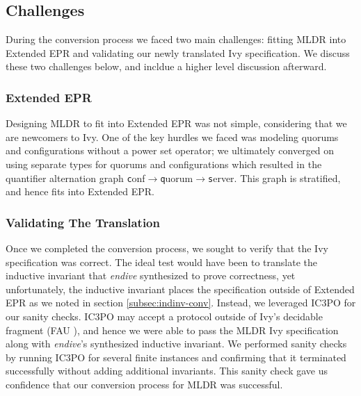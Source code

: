 \documentclass[runningheads]{llncs}
\newcommand{\ivy}[1]{{\texttt #1}}
\begin{document}
\subsection{Challenges}

During the conversion process we faced two main challenges: fitting MLDR into Extended EPR and validating our newly translated Ivy specification.  We discuss these two challenges below, and incldue a higher level discussion afterward.

\subsubsection{Extended EPR}
\label{sec:mldr-epr}



Designing MLDR to fit into Extended EPR was not simple, considering that we are newcomers to Ivy.  One of the key hurdles we faced was modeling quorums and configurations without a power set operator; we ultimately converged on using separate types for quorums and configurations which resulted in the quantifier alternation graph \ivy{conf}$\to$\ivy{quorum}$\to$\ivy{server}.  This graph is stratified, and hence fits into Extended EPR.  

\subsubsection{Validating The Translation}


Once we completed the conversion process, we sought to verify that the Ivy specification was correct.  The ideal test would have been to translate the inductive invariant that \textit{endive} synthesized to prove correctness, yet unfortunately, the inductive invariant places the specification outside of Extended EPR as we noted in section \ref{subsec:indinv-conv}.  Instead, we leveraged IC3PO for our sanity checks.  IC3PO may accept a protocol outside of Ivy's decidable fragment (FAU \cite{Ge2009Complete}), and hence we were able to pass the MLDR Ivy specification along with \textit{endive}'s synthesized inductive invariant.  We performed sanity checks by running IC3PO for several finite instances and confirming that it terminated successfully without adding additional invariants.  This sanity check gave us confidence that our conversion process for MLDR was successful.
\end{document}
